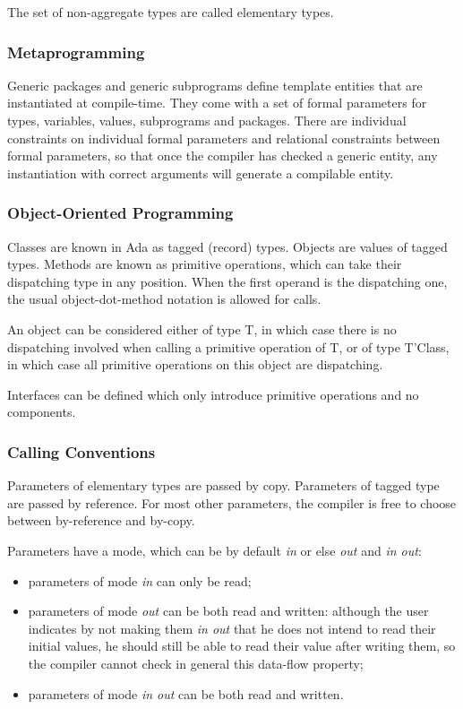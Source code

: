\documentclass[fullpage]{article}
\begin{document}
The set of non-aggregate types are called elementary types.

\subsubsection{Metaprogramming}

Generic packages and generic subprograms define template entities that are
instantiated at compile-time. They come with a set of formal parameters for
types, variables, values, subprograms and packages. There are individual
constraints on individual formal parameters and relational constraints between
formal parameters, so that once the compiler has checked a generic entity, any
instantiation with correct arguments will generate a compilable entity.

\subsubsection{Object-Oriented Programming}

Classes are known in Ada as tagged (record) types. Objects are values of tagged
types. Methods are known as primitive operations, which can take their
dispatching type in any position. When the first operand is the dispatching
one, the usual object-dot-method notation is allowed for calls.

An object can be considered either of type T, in which case there is no
dispatching involved when calling a primitive operation of T, or of type
T'Class, in which case all primitive operations on this object are dispatching.

Interfaces can be defined which only introduce primitive operations and no
components.

\subsubsection{Calling Conventions}

Parameters of elementary types are passed by copy.  Parameters of tagged type
are passed by reference. For most other parameters, the compiler is free to
choose between by-reference and by-copy.

Parameters have a mode, which can be by default \emph{in} or else \emph{out}
and \emph{in out}:
\begin{itemize}
\item parameters of mode \emph{in} can only be read;
\item parameters of mode \emph{out} can be both read and written: although the
  user indicates by not making them \emph{in out} that he does not intend to
  read their initial values, he should still be able to read their value after
  writing them, so the compiler cannot check in general this data-flow
  property;
\item parameters of mode \emph{in out} can be both read and written.
\end{itemize}
\end{document}
